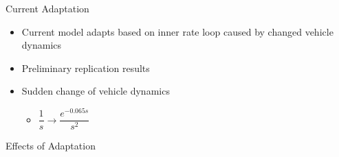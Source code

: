 \documentclass[10pt]{beamer}
\begin{document}
\begin{frame}[fragile]{Current Adaptation}
  \begin{itemize}
    \setlength\itemsep{1em}
    \item Current model adapts based on inner rate loop caused by changed vehicle dynamics
    \item Preliminary replication results
    \item Sudden change of vehicle dynamics
    \begin{itemize}
      \item $\dfrac{1}{s} \rightarrow \dfrac{e^{-0.065s}}{s^2}$
    \end{itemize}
  \end{itemize}
\end{frame}

\begin{frame}[fragile]{Effects of Adaptation}
  \begin{columns}[T]
    \begin{column}{\textwidth}
\end{column}
\end{columns}
\end{frame}
\end{document}
